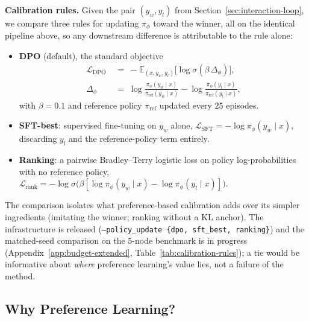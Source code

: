 \documentclass[twoside]{article}
\theoremstyle{plain}
\theoremstyle{definition}
\theoremstyle{remark}
\begin{document}
\textbf{Calibration rules.} Given the pair $(y_w, y_l)$ from Section~\ref{sec:interaction-loop}, we compare three rules for updating $\pi_\phi$ toward the winner, all on the identical pipeline above, so any downstream difference is attributable to the rule alone:
\begin{itemize}[leftmargin=1.2em,topsep=0.2em,itemsep=0.1em]
\item \textbf{DPO} (default), the standard objective \citep{rafailov2023direct}
\begin{align}
\label{eq:dpo-loss}
\mathcal{L}_{\text{DPO}} &\;=\; -\mathbb{E}_{(x, y_w, y_l)}\big[\log\sigma(\beta\,\Delta_\phi)\big], \\
\Delta_\phi &\;=\; \log\tfrac{\pi_\phi(y_w \mid x)}{\pi_\text{ref}(y_w \mid x)} - \log\tfrac{\pi_\phi(y_l \mid x)}{\pi_\text{ref}(y_l \mid x)}, \nonumber
\end{align}
with $\beta = 0.1$ and reference policy $\pi_\text{ref}$ updated every 25 episodes.
\item \textbf{SFT-best}: supervised fine-tuning on $y_w$ alone, $\mathcal{L}_{\text{SFT}} = -\log\pi_\phi(y_w \mid x)$, discarding $y_l$ and the reference-policy term entirely.
\item \textbf{Ranking}: a pairwise Bradley--Terry logistic loss on policy log-probabilities with no reference policy, $\mathcal{L}_{\text{rank}} = -\log\sigma\big(\beta[\log\pi_\phi(y_w\mid x) - \log\pi_\phi(y_l\mid x)]\big)$.
\end{itemize}
The comparison isolates what preference-based calibration adds over its simpler ingredients (imitating the winner; ranking without a KL anchor). The infrastructure is released (\texttt{--policy\_update \{dpo, sft\_best, ranking\}}) and the matched-seed comparison on the 5-node benchmark is in progress (Appendix~\ref{app:budget-extended}, Table~\ref{tab:calibration-rules}); a tie would be informative about \emph{where} preference learning's value lies, not a failure of the method.

\subsection{Why Preference Learning?}
\label{sec:theory}
\end{document}
